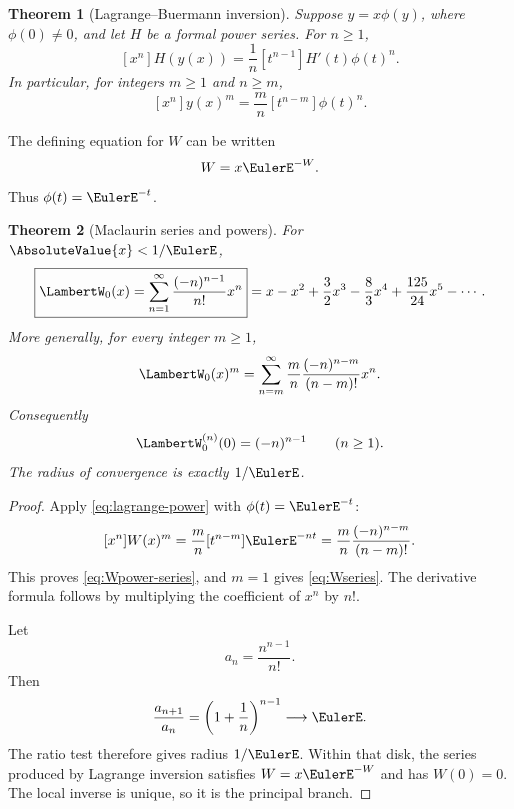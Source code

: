 \documentclass[11pt]{article}
\newtheorem{theorem}{Theorem}[section]
\theoremstyle{remark}
\newcommand{\Wz}{\LambertW_{0}}
\begin{document}
\begin{theorem}[Lagrange--Buer\-mann inversion]\label{thm:lagrange}
Suppose \(y=x\phi(y)\), where \(\phi(0)\neq0\), and let \(H\) be a formal
power series.  For \(n\geq1\),
\begin{equation}\label{eq:lagrange}
 [x^n]H(y(x))
 =\frac1n[t^{n-1}]H'(t)\phi(t)^n.
\end{equation}
In particular, for integers \(m\geq1\) and \(n\geq m\),
\begin{equation}\label{eq:lagrange-power}
 [x^n]y(x)^m
 =\frac{m}{n}[t^{n-m}]\phi(t)^n.
\end{equation}
\end{theorem}

The defining equation for \(W\) can be written
\[
       W=x\EulerE^{-W}.
\]
Thus \(\phi(t)=\EulerE^{-t}\).

\begin{theorem}[Maclaurin series and powers]\label{thm:maclaurin}
For \(\AbsoluteValue{x}<1/\EulerE\),
\begin{equation}\label{eq:Wseries}
 \boxed{\displaystyle
 \Wz(x)=\sum_{n=1}^{\infty}
       \frac{(-n)^{n-1}}{n!}x^n}
 =x-x^2+\frac32x^3-\frac83x^4
  +\frac{125}{24}x^5-\cdots.
\end{equation}
More generally, for every integer \(m\geq1\),
\begin{equation}\label{eq:Wpower-series}
 \Wz(x)^m
 =\sum_{n=m}^{\infty}
   \frac{m}{n}\frac{(-n)^{n-m}}{(n-m)!}x^n.
\end{equation}
Consequently
\begin{equation}\label{eq:derivatives-zero}
       \Wz^{(n)}(0)=(-n)^{n-1}\qquad(n\geq1).
\end{equation}
The radius of convergence is exactly \(1/\EulerE\).
\end{theorem}

\begin{proof}
Apply \eqref{eq:lagrange-power} with
\(\phi(t)=\EulerE^{-t}\):
\[
 [x^n]W(x)^m
 =\frac{m}{n}[t^{n-m}]\EulerE^{-nt}
 =\frac{m}{n}\frac{(-n)^{n-m}}{(n-m)!}.
\]
This proves \eqref{eq:Wpower-series}, and \(m=1\) gives
\eqref{eq:Wseries}.  The derivative formula follows by multiplying the
coefficient of \(x^n\) by \(n!\).

Let
\[
       a_n=\frac{n^{n-1}}{n!}.
\]
Then
\[
 \frac{a_{n+1}}{a_n}
 =\left(1+\frac1n\right)^{n-1}\longrightarrow\EulerE.
\]
The ratio test therefore gives radius \(1/\EulerE\).  Within that disk, the
series produced by Lagrange inversion satisfies \(W=x\EulerE^{-W}\) and has
\(W(0)=0\).  The local inverse is unique, so it is the principal branch.
\end{proof}
\end{document}
